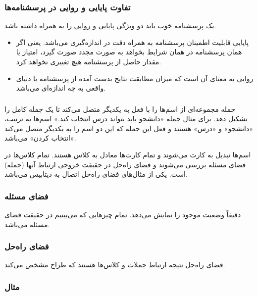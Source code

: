 \subsubsection*{تفاوت پایایی و روایی در پرسشنامه‌ها}

یک پرسشنامه خوب باید دو ویژگی پایایی و روایی را به همراه داشته باشد. 

\begin{itemize}
    \item پایایی قابلیت اطمینان پرسشنامه به همراه دقت در اندازه‌گیری می‌باشد.
    یعنی اگر همان پرسشنامه در همان شرایط بخواهد به صورت مجدد صورت گیرد، امتیاز
    یا مقدار حاصل از پرسشنامه هیچ تغییری نخواهد کرد.
    \item روایی به معنای آن است که میزان مطابقت نتایج بدست آمده از پرسشنامه با
    دنیای واقعی به چه اندازه‌ای می‌باشد.
\end{itemize}

\subsubsection{}

جمله مجموعه‌ای از اسم‌ها را با فعل به یکدیگر متصل می‌کند تا یک جمله کامل را
تشکیل دهد. برای مثال جمله «دانشجو باید بتواند درس انتخاب کند.» اسم‌ها به ترتیب،
«دانشجو» و «درس» هستند و فعل این جمله که این دو اسم را به یکدیگر متصل می‌کند
«انتخاب کردن» می‌باشد.

اسم‌ها تبدیل به کارت می‌شوند و تمام کارت‌ها معادل به کلاس هستند. تمام کلاس‌ها در
فضای مسئله بررسی می‌شوند و فضای راه‌حل در حقیقت خروجی ارتباط آنها (جمله) است.
یکی از مثال‌های فضای راه‌حل اتصال به دیتابیس می‌باشد.

\subsubsection*{فضای مسئله}

دقیقاً وضعیت موجود را نمایش می‌دهد. تمام چیز‌هایی که می‌بینیم در حقیقت فضای
مسئله می‌باشد.

\subsubsection*{فضای راه‌حل}

فضای راه‌حل نتیجه ارتباط جملات و کلاس‌ها هستند که طراح مشخص می‌کند.

\subsubsection*{مثال}

